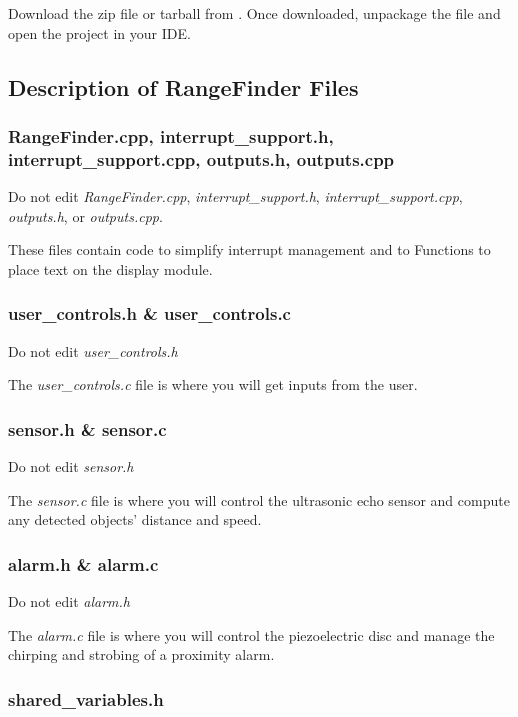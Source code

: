 Download the zip file or tarball from \filesource.
Once downloaded, unpackage the file and open the project in your IDE\@.

\subsection{Description of RangeFinder Files}

\subsubsection{RangeFinder.cpp, interrupt\_support.h, interrupt\_support.cpp, outputs.h, outputs.cpp}

Do not edit \textit{RangeFinder.cpp}, \textit{interrupt\_support.h}, \textit{interrupt\_support.cpp}, \textit{outputs.h}, or \textit{outputs.cpp}.

These files contain code to simplify interrupt management and to Functions to place text on the display module.

\subsubsection{user\_controls.h \& user\_controls.c}

Do not edit \textit{user\_controls.h}

The \textit{user\_controls.c} file is where you will get inputs from the user.

\subsubsection{sensor.h \& sensor.c}

Do not edit \textit{sensor.h}

The \textit{sensor.c} file is where you will control the ultrasonic echo sensor and compute any detected objects' distance and speed.

\subsubsection{alarm.h \& alarm.c}

Do not edit \textit{alarm.h}

The \textit{alarm.c} file is where you will control the piezoelectric disc and manage the chirping and strobing of a proximity alarm.

\subsubsection{shared\_variables.h}

